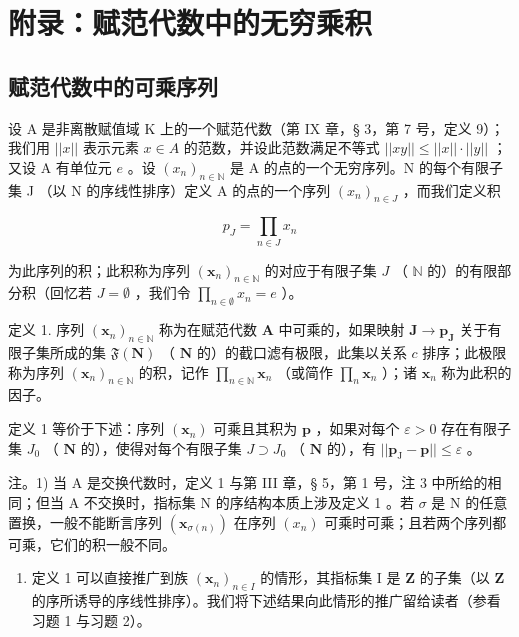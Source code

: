 \section*{附录：赋范代数中的无穷乘积}
{}

\subsection{赋范代数中的可乘序列}

设 A 是非离散赋值域 K 上的一个赋范代数（第 IX 章，§ 3，第 7 号，定义 9）；我们用 \(||x||\) 表示元素 \(x \in A\) 的范数，并设此范数满足不等式 \(||xy|| \leqslant ||x|| \cdot ||y||\) ；又设 A 有单位元 \(e\) 。设 \((x_n)_{n \in \mathbb{N}}\) 是 A 的点的一个无穷序列。N 的每个有限子集 J （以 N 的序线性排序）定义 A 的点的一个序列 \((x_n)_{n \in J}\) ，而我们定义积

\[
p _ {J} = \prod_ {n \in J} x _ {n}
\]

为此序列的积；此积称为序列 \((\pmb{x}_n)_{n\in \mathbb{N}}\) 的对应于有限子集 \(J\) （ \(\mathbb{N}\) 的）的有限部分积（回忆若 \(J = \emptyset\) ，我们令 \(\prod_{n\in \emptyset}x_n = e\) ）。

定义 1. 序列 \((\pmb{x}_n)_{n\in \mathbb{N}}\) 称为在赋范代数 \(\mathbf{A}\) 中可乘的，如果映射 \(\mathbf{J}\to \pmb{p}_{\mathbf{J}}\) 关于有限子集所成的集 \(\mathfrak{F}(\mathbf{N})\) （ \(\mathbf{N}\) 的）的截口滤有极限，此集以关系 \(c\) 排序；此极限称为序列 \((\pmb{x}_n)_{n\in \mathbb{N}}\) 的积，记作 \(\prod_{n\in \mathbb{N}}\pmb{x}_n\) （或简作 \(\prod_{n}\pmb{x}_n\) ）；诸 \(\pmb{x}_n\) 称为此积的因子。

定义 1 等价于下述：序列 \((\pmb{x}_n)\) 可乘且其积为 \(\pmb{p}\) ，如果对每个 \(\varepsilon > 0\) 存在有限子集 \(J_0\) （ \(\mathbf{N}\) 的），使得对每个有限子集 \(J \supset J_0\) （ \(\mathbf{N}\) 的），有 \(||\pmb{p}_{\mathrm{J}} - \pmb{p}|| \leqslant \varepsilon\) 。

注。1) 当 A 是交换代数时，定义 1 与第 III 章，§ 5，第 1 号，注 3 中所给的相同；但当 A 不交换时，指标集 N 的序结构本质上涉及定义 1 。若 \(\sigma\) 是 N 的任意置换，一般不能断言序列 \((\pmb{x}_{\sigma(n)})\) 在序列 \((x_{n})\) 可乘时可乘；且若两个序列都可乘，它们的积一般不同。

\begin{enumerate}
\def\labelenumi{\arabic{enumi})}
\setcounter{enumi}{1}
\tightlist
\item
  定义 1 可以直接推广到族 \((\pmb{x}_n)_{n\in I}\) 的情形，其指标集 I 是 \(\mathbf{Z}\) 的子集（以 \(\mathbf{Z}\) 的序所诱导的序线性排序）。我们将下述结果向此情形的推广留给读者（参看习题 1 与习题 2）。
\end{enumerate}

